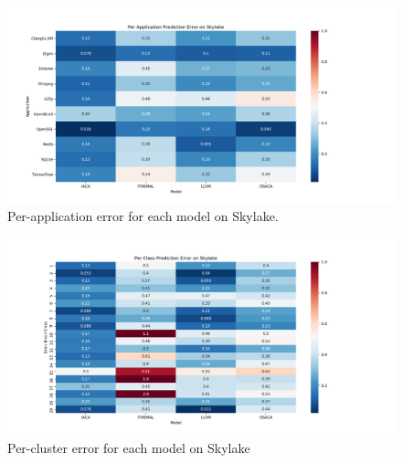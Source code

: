 \begin{figure}
\includegraphics[width=\columnwidth]{figures/skl-app-err.png}
\caption{Per-application error for each model on Skylake. }
\label{fig:hsw-app-err}
\end{figure}

\begin{figure}
\includegraphics[width=\columnwidth]{figures/skl-cluster-err.png}
\caption{Per-cluster error for each model on Skylake}
\label{fig:hsw-cluster-err}
\end{figure}    